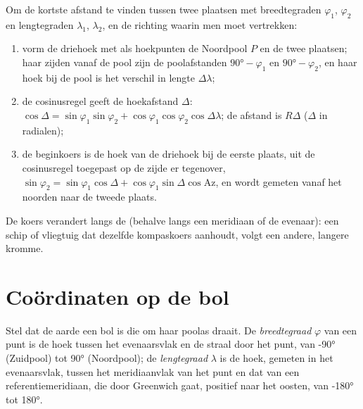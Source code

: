 \begin{method}\label{met:b1:spherical-astronomy:great-circle}
Om de kortste afstand te vinden tussen twee plaatsen met breedtegraden $\varphi_1$,
$\varphi_2$ en lengtegraden $\lambda_1$, $\lambda_2$, en de richting waarin men moet vertrekken:
\begin{enumerate}
  \item vorm de driehoek met als hoekpunten de Noordpool $P$ en de twee
        plaatsen; haar zijden vanaf de pool zijn de poolafstanden $\ang{90} -
        \varphi_1$ en $\ang{90} - \varphi_2$, en haar hoek bij de pool is het
        verschil in lengte $\Delta\lambda$;
  \item de cosinusregel geeft de hoekafstand $\Delta$:
        $\cos\Delta = \sin\varphi_1\sin\varphi_2 +
        \cos\varphi_1\cos\varphi_2\cos\Delta\lambda$; de afstand is
        $R\Delta$ ($\Delta$ in radialen);
  \item de beginkoers is de hoek van de driehoek bij de eerste plaats, uit
        de cosinusregel toegepast op de zijde er tegenover,
        $\sin\varphi_2 = \sin\varphi_1\cos\Delta + \cos\varphi_1\sin\Delta\cos
        \mathrm{Az}$, en wordt gemeten vanaf het noorden naar de tweede plaats.
\end{enumerate}
De koers verandert langs de  (behalve langs een meridiaan of de
evenaar): een schip of vliegtuig dat dezelfde kompaskoers aanhoudt, volgt een
andere, langere kromme.
\end{method}

\section{Coördinaten op de bol}

\begin{definition}\label{def:b1:spherical-astronomy:geographic}
Stel dat de aarde een bol is die om haar poolas draait. De
\emph{breedtegraad} $\varphi$ van een punt is de hoek tussen
het evenaarsvlak en de straal door het punt, van \ang{-90}
(Zuidpool) tot \ang{+90} (Noordpool); de \emph{lengtegraad}
$\lambda$ is de hoek, gemeten in het evenaarsvlak, tussen het meridiaanvlak van
het punt en dat van een referentiemeridiaan, die door Greenwich gaat, positief
naar het oosten, van \ang{-180} tot \ang{180}.
\end{definition}

